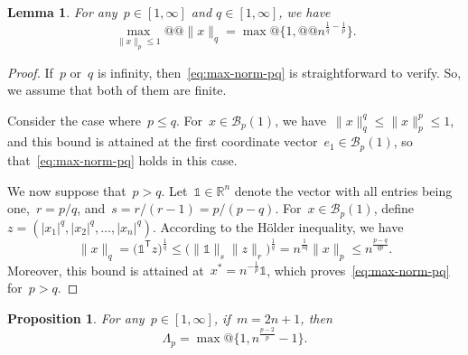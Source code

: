 \documentclass{article}
\theoremstyle{definition}
\theoremstyle{plain}
\newtheorem{proposition}{Proposition}[section]
\newtheorem{lemma}{Lemma}[section]
\theoremstyle{remark}
\newcommand*{\abs}[2][]{#1\lvert#2#1\rvert}
\newcommand*{\norm}[2][]{#1\lVert#2#1\rVert}
\newcommand*{\set}[2][]{#1\{#2#1\}}
\newcommand*{\R}{\mathbb{R}}
\newcommand*{\T}{\mathsf{T}}
\newcommand*{\ones}{\mathbb{1}}
\begin{document}
\begin{lemma}
    \label{lem:max-norm-pq}
    For any~$p \in [1, \infty]$ and $q \in [1, \infty]$, we have
    \begin{equation}
        \label{eq:max-norm-pq}
        \max_{\norm{x}_p \le 1} @@ \norm{x}_q = \max @ \set{1, @@ n^{\frac{1}{q} - \frac{1}{p}}}.
    \end{equation}
\end{lemma}

\begin{proof}
    If~$p$ or~$q$ is infinity, then~\eqref{eq:max-norm-pq} is straightforward to verify.
    So, we assume that both of them are finite.

    Consider the case where~$p \le q$.
    For~$x \in \mathcal{B}_p(1)$, we have~$\norm{x}_q^q \le \norm{x}_p^p \le 1$, and this bound is attained at the first coordinate vector~$e_1 \in \mathcal{B}_p(1)$, so that~\eqref{eq:max-norm-pq} holds in this case.

    We now suppose that~$p > q$.
    Let~$\ones \in \R^n$ denote the vector with all entries being one,~$r = p/q$, and~$s = r / (r - 1) = p / (p - q)$.
    For~$x \in \mathcal{B}_p(1)$, define~$z = (\abs{x_1}^q, \abs{x_2}^q, \dots, \abs{x_n}^q)$.
    According to the H{\"{o}}lder inequality, we have
    \begin{equation*}
        \norm{x}_q  = \big(\ones^{\T} z \big)^{\frac{1}{q}} \le \big(\norm{\ones}_s \norm{z}_r \big)
        ^{\frac{1}{q}} = n^{\frac{1}{sq}} \norm{x}_p \le n^{\frac{p - q}{qp}}.
    \end{equation*}
    Moreover, this bound is attained at~$x^\ast = n^{-\frac{1}{p}} \ones$, which proves~\eqref{eq:max-norm-pq} for~$p > q$.
\end{proof}

\begin{proposition}
    \label{prop:lambda-p-opt}
    For any~$p \in [1,\infty]$, if~$m = 2n + 1$, then
    \begin{equation*}
        \Lambda_p = \max @ \set[\big]{1, n^{\frac{p - 2}{p}} - 1}.
    \end{equation*}
\end{proposition}
\end{document}
